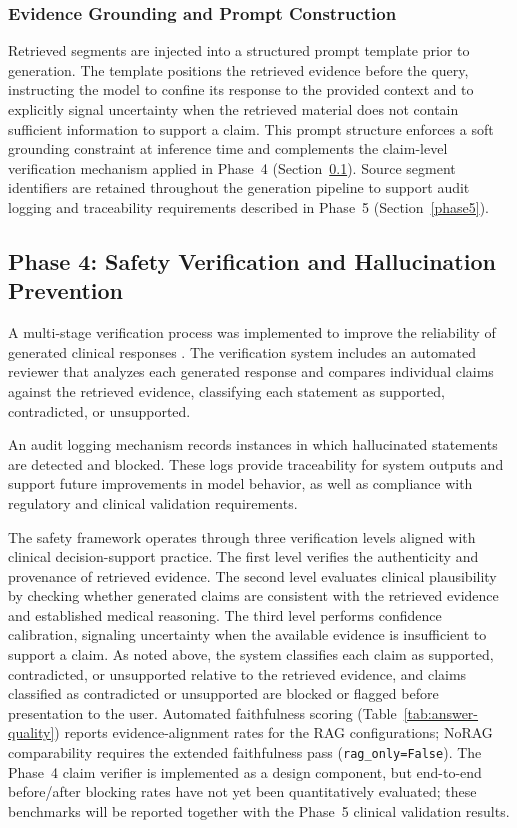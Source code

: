 \subsubsection{Evidence Grounding and Prompt Construction}

Retrieved segments are injected into a structured prompt template prior to 
generation. The template positions the retrieved evidence before the query, 
instructing the model to confine its response to the provided context and to 
explicitly signal uncertainty when the retrieved material does not contain 
sufficient information to support a claim. This prompt structure enforces a 
soft grounding constraint at inference time and complements the claim-level 
verification mechanism applied in Phase~4 (Section~\ref{phase4}). Source 
segment identifiers are retained throughout the generation pipeline to support 
audit logging and traceability requirements described in Phase~5 
(Section~\ref{phase5}).

\subsection{Phase 4: Safety Verification and Hallucination Prevention}
\label{phase4}

A multi-stage verification process was implemented to improve the reliability 
of generated clinical responses \cite{asgari2022hallucination, 
nishizaki2025reducing}. The verification system includes an automated 
reviewer that analyzes each generated response and compares individual claims 
against the retrieved evidence, classifying each statement as supported, 
contradicted, or unsupported.

An audit logging mechanism records instances in which hallucinated statements 
are detected and blocked. These logs provide traceability for system outputs 
and support future improvements in model behavior, as well as compliance with 
regulatory and clinical validation requirements.

The safety framework operates through three verification levels aligned with 
clinical decision-support practice. The first level verifies the authenticity 
and provenance of retrieved evidence. The second level evaluates clinical 
plausibility by checking whether generated claims are consistent with the 
retrieved evidence and established medical reasoning. The third level performs 
confidence calibration, signaling uncertainty when the available evidence is 
insufficient to support a claim. As noted above, the system classifies each 
claim as supported, contradicted, or unsupported relative to the retrieved 
evidence, and claims classified as contradicted or unsupported are blocked or 
flagged before presentation to the user. Automated faithfulness scoring 
(Table~\ref{tab:answer-quality}) reports evidence-alignment rates for the RAG 
configurations; NoRAG comparability requires the extended faithfulness pass 
(\texttt{rag\_only=False}). The Phase~4 claim verifier is implemented as a 
design component, but end-to-end before/after blocking rates have not yet 
been quantitatively evaluated; these benchmarks will be reported together 
with the Phase~5 clinical validation results.

